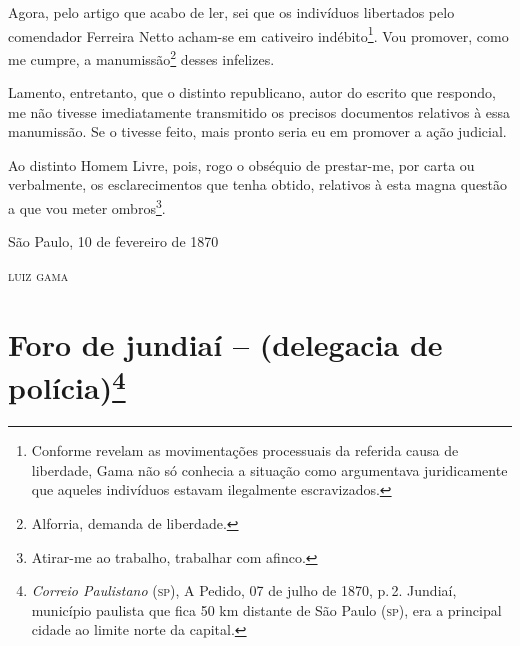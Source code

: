 Agora, pelo artigo que acabo de ler, sei que os indivíduos libertados
pelo comendador Ferreira Netto acham-se em cativeiro
indébito\footnote{ Conforme revelam as movimentações processuais da
  referida causa de liberdade, Gama não só conhecia a situação como
  argumentava juridicamente que aqueles indivíduos estavam ilegalmente
  escravizados.}. Vou promover, como me cumpre, a manumissão\footnote{
  Alforria, demanda de liberdade.} desses infelizes.

Lamento, entretanto, que o distinto republicano, autor do escrito que
respondo, me não tivesse imediatamente transmitido os precisos
documentos relativos à essa manumissão. Se o tivesse feito, mais pronto
seria eu em promover a ação judicial.

Ao distinto Homem Livre, pois, rogo o obséquio de prestar-me, por carta
ou verbalmente, os esclarecimentos que tenha obtido, relativos à esta
magna questão a que vou meter ombros\footnote{ Atirar-me ao trabalho,
  trabalhar com afinco.}.

\begin{flushright}
São Paulo, 10 de fevereiro de 1870

\textsc{luiz gama}
\end{flushright}

\chapter{Foro de jundiaí -- (delegacia de polícia)\footnote{\emph{Correio Paulistano} (\textsc{sp}), A Pedido, 07 de julho de 1870,
  p.\,2. Jundiaí, município paulista que fica 50 km distante de São Paulo
  (\textsc{sp}), era a principal cidade ao limite norte da capital.}} %

